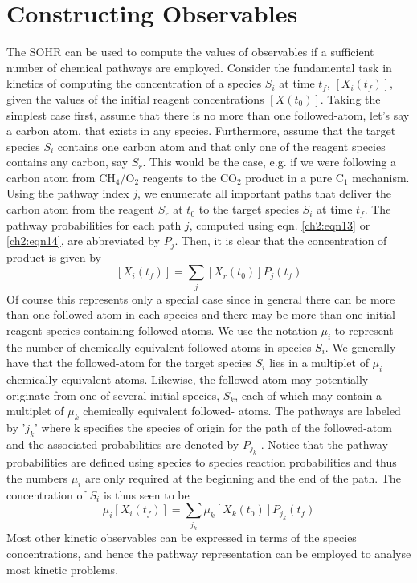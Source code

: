 \section{Constructing Observables}
\label{ch2:sec:const_ob}
The SOHR can be used to compute the values of observables if a sufficient number
of chemical pathways are employed. Consider the fundamental task in kinetics of
computing the concentration of a species $S_i$ at time $t_f$, $[X_i(t_f)]$, given the values of the
initial reagent concentrations $[X(t_0)]$. Taking the simplest case first, assume that there
is no more than one followed-atom, let’s say a carbon atom, that exists in any species.
Furthermore, assume that the target species $S_i$ contains one carbon atom and that
only one of the reagent species contains any carbon, say $S_r$. This would be the case,
e.g. if we were following a carbon atom from CH$_4$/O$_2$ reagents to the CO$_2$ product
in a pure C$_1$ mechanism. Using the pathway index $j$, we enumerate all important
paths that deliver the carbon atom from the reagent $S_r$ at $t_0$ to the target species $S_i$ at
time $t_f$. The pathway probabilities for each path $j$, computed using eqn. \ref{ch2:eqn13}
or \ref{ch2:eqn14}, are abbreviated by $P_j$. Then, it is clear that the concentration of product is
given by
\begin{equation}
\label{ch2:eqn15}
\left[X_{i}(t_f)\right] = \sum_{j}{\left[ X_{r}(t_0) \right] P_{j}(t_f)}
\end{equation}
Of course this represents only a special case since in general there can be more than
one followed-atom in each species and there may be more than one initial reagent species
containing followed-atoms. We use the notation $\mu_{i}$ to represent the number of
chemically equivalent followed-atoms in species $S_i$. We generally have that the followed-atom for the target species $S_i$ lies in a multiplet of $\mu_{i}$ chemically equivalent
atoms. Likewise, the followed-atom may potentially originate from one of several initial
species, $S_k$, each of which may contain a multiplet of $\mu_{k}$ chemically equivalent followed-
atoms. The pathways are labeled by '$j_k$' where k specifies the species of origin
for the path of the followed-atom and the associated probabilities are denoted by $P_{j_k}$ .
Notice that the pathway probabilities are defined using species to species reaction probabilities
and thus the numbers $\mu_{i}$ are only required at the beginning and the end of the
path. The concentration of $S_i$ is thus seen to be
\begin{equation}
\label{ch2:eqn16}
\mu_{i} \left[X_{i}(t_f)\right] = \sum_{j_k}{ \mu_{k} \left[ X_{k}(t_0) \right] P_{j_k}(t_f)}
\end{equation}
Most other kinetic observables can be expressed in terms of the species concentrations,
and hence the pathway representation can be employed to analyse most kinetic
problems.
